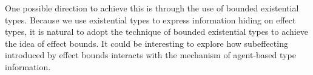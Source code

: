 One possible direction to achieve this is through the use of bounded existential types. Because we use existential types to express information hiding on effect types, it is natural to adopt the technique of bounded existential types to achieve the idea of effect bounds. It could be interesting to explore how subeffecting introduced by effect bounds interacts with the mechanism of agent-based type information.




\begin{comment}
\section{Wyvern with Algebraic Effects hand Handlers}
\todo[inline]{Finish this section}

\subsection{Syntax}
\begin{figure}[htb]
\footnotesize{
\[
\begin{array}{lll}
\begin{array}{lllr}
e & ::= & x \\
& | & l\\
& | & \keyw{new}(x \Rightarrow \overline{d}) \\
& | & [e]_j^\tau\\
& | & e \rhd \tau\\

c & ::= & \m{return} e\\
& | & e.m(e)\\
& | & op(e; y.c)\\
& | & \m{with} h \m{handle} c\\
& | & [c]^\sigma\\
& | &[op]^\varepsilon(e; y.c)


\end{array}
\begin{array}{lllr}
d & ::= & m(x:\tau) = c \\
& |   & \keyw{effect} E =  \varepsilon \\
\varepsilon & ::= & \cdot \mid e.E, \varepsilon \mid op, \varepsilon\\
\tau & ::= & \{ x \Rightarrow \overline{\rho} \} \\
\Gamma & :: = & \varnothing~|~\Gamma,~x : \tau \\
\rho & ::= & m : \tau \rightarrow \sigma \\
       & |   & \keyw{effect} E \\
       & |   & \keyw{effect} E = \varepsilon  \\
\sigma & ::= & \{\varepsilon\}\tau \\
\end{array}
\end{array}
\]
}
\caption{Wyvern's object-oriented core syntax with algebraic effects and handlers}
\label{fig-wyv}
\end{figure}



\end{comment}
